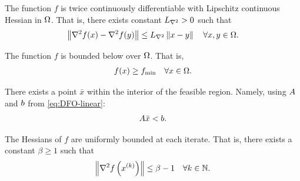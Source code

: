 \documentclass{article}
\begin{document}
\begin{assumption}
\label{for_fully_quadratic}
\label{lipschitz_hessian}
The function $f$ is twice continuously differentiable with Lipschitz continuous Hessian in $\Omega$.   That is, there exists constant ${L_{\nabla^2}} > 0$ such that 
\begin{align}
\left\|\nabla^2 f(x) - \nabla^2 f(y)\right\| \le {L_{\nabla^2}} \left\|x - y\right\| \quad \forall x, y \in \Omega.
\end{align}
\end{assumption}




\begin{assumption}
\label{lower_bound}
The function $f$ is bounded below over $\Omega$.
That is,
\begin{align}
f(x) \ge f_{\text{min}} \quad \forall x \in \Omega.
\end{align}
\end{assumption}

\begin{assumption}
\label{interior_point}
There exists a point $\bar x$ within the interior of the feasible region.
Namely, using ${A}$ and ${b}$ from \cref{eq:DFO-linear}:
\begin{align}
{A} \bar x < {b}.
\end{align}
\end{assumption}


\begin{assumption}
\label{uniformly_bounded_hessians_of_f}
The Hessians of $f$ are uniformly bounded at each iterate. That is, there exists a constant $\beta \ge 1$ such that
\begin{align*}
\left\|\nabla^2 f\left(x^{(k)}\right)\right\| \le \beta - 1\quad \forall k \in \mathbb N.
\end{align*}
\end{assumption}


%



\end{document}
